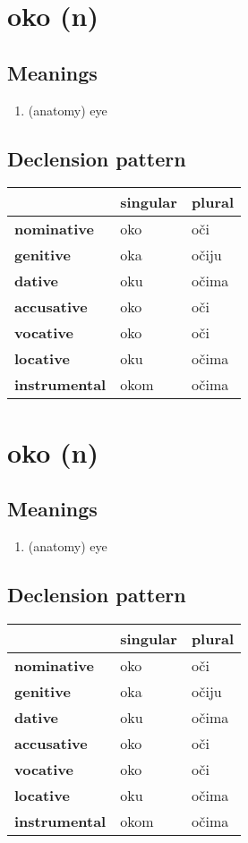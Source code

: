 \filbreak
\section{oko (n)}
\subsection*{Meanings}
\begin{enumerate}
\item (anatomy) eye
\end{enumerate}
\subsection*{Declension pattern}
\begin{tabularx}{\linewidth}{Xll}
\toprule
{} & singular & plural \\
\midrule
\textbf{nominative  } &      oko &    oči \\
\textbf{genitive    } &      oka &  očiju \\
\textbf{dative      } &      oku &  očima \\
\textbf{accusative  } &      oko &    oči \\
\textbf{vocative    } &      oko &    oči \\
\textbf{locative    } &      oku &  očima \\
\textbf{instrumental} &     okom &  očima \\
\bottomrule
\end{tabularx}

\filbreak
\section{oko (n)}
\subsection*{Meanings}
\begin{enumerate}
\item (anatomy) eye
\end{enumerate}
\subsection*{Declension pattern}
\begin{tabularx}{\linewidth}{Xll}
\toprule
{} & singular & plural \\
\midrule
\textbf{nominative  } &      oko &    oči \\
\textbf{genitive    } &      oka &  očiju \\
\textbf{dative      } &      oku &  očima \\
\textbf{accusative  } &      oko &    oči \\
\textbf{vocative    } &      oko &    oči \\
\textbf{locative    } &      oku &  očima \\
\textbf{instrumental} &     okom &  očima \\
\bottomrule
\end{tabularx}

